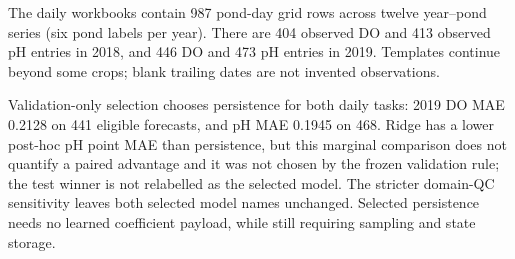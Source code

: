 The daily workbooks contain 987 pond-day grid rows across twelve year--pond series (six pond labels per year). There are 404 observed DO and 413 observed pH entries in 2018, and 446 DO and 473 pH entries in 2019. Templates continue beyond some crops; blank trailing dates are not invented observations.

Validation-only selection chooses persistence for both daily tasks: 2019 DO MAE 0.2128 on 441 eligible forecasts, and pH MAE 0.1945 on 468. Ridge has a lower post-hoc pH point MAE than persistence, but this marginal comparison does not quantify a paired advantage and it was not chosen by the frozen validation rule; the test winner is not relabelled as the selected model. The stricter domain-QC sensitivity leaves both selected model names unchanged. Selected persistence needs no learned coefficient payload, while still requiring sampling and state storage.